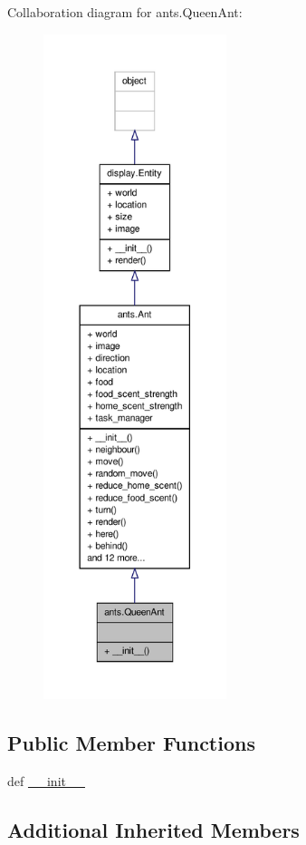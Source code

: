 Collaboration diagram for ants.\+Queen\+Ant\+:
\nopagebreak
\begin{figure}[H]
\begin{center}
\leavevmode
\includegraphics[height=550pt]{classants_1_1QueenAnt__coll__graph}
\end{center}
\end{figure}
\subsection*{Public Member Functions}
\begin{DoxyCompactItemize}
\item 
def \hyperlink{classants_1_1QueenAnt_aea3ff8fa90122567905806f675eb9472}{\+\_\+\+\_\+init\+\_\+\+\_\+}
\end{DoxyCompactItemize}
\subsection*{Additional Inherited Members}


